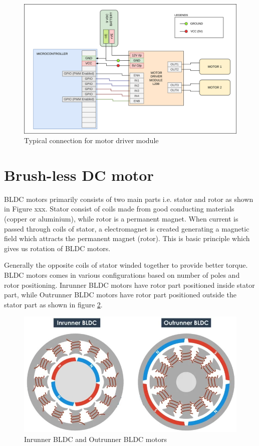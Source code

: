 \begin{figure}[h!]
\centering
\includegraphics[width=\columnwidth]{./Figures/Driver_module_connection.png}
\caption{Typical connection for motor driver module}
\label{Driver_module_connection}
\end{figure}

\newpage
\section{Brush-less DC motor}
\par BLDC motors primarily consists of two main parts i.e. stator and rotor as shown in Figure xxx. Stator consist of coils made from good conducting materials (copper or aluminium), while rotor is a permanent magnet. When current is passed through coils of stator, a electromagnet is created generating a magnetic field which attracts the permanent magnet (rotor). This is basic principle which gives us rotation of BLDC motors.

\par Generally the opposite coils of stator winded together to provide better torque. BLDC motors comes in various configurations based on number of poles and rotor positioning. Inrunner BLDC motors have rotor part positioned inside stator part, while Outrunner BLDC motors have rotor part positioned outside the stator part as shown in figure \ref{BLDC_runner}.

\begin{figure}[h!]
\centering
\includegraphics[width=12cm]{./Figures/BLDC_runner.jpg}
\caption{Inrunner BLDC and Outrunner BLDC motors}
\label{BLDC_runner}
\end{figure}

